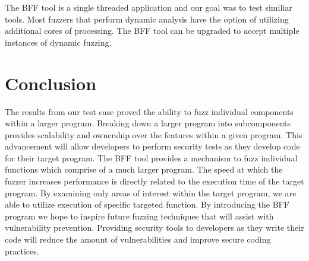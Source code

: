 \documentclass[conference]{IEEEtran}
\begin{document}
The BFF tool is a single threaded application and our goal was to test similiar tools. Most fuzzers that perform dynamic analysis have the option of utilizing additional cores of processing. The BFF tool can be upgraded to accept multiple instances of dynamic fuzzing. 

\section{Conclusion}
The results from our test case proved the ability to fuzz individual components within a larger program. Breaking down a larger program into subcomponents provides scalability and ownership over the features within a given program. This advancement will allow developers to perform security tests as they develop code for their target program. The BFF tool provides a mechanism to fuzz individual functions which comprise of a much larger program. The speed at which the fuzzer increases performance is directly related to the execution time of the target program. By examining only areas of interest within the target program, we are able to utilize execution of specific targeted function. By introducing the BFF program we hope to inspire future fuzzing techniques that will assist with vulnerability prevention. Providing security tools to developers as they write their code will reduce the amount of vulnerabilities and improve secure coding practices. 

\nocite{*}


\end{document}
